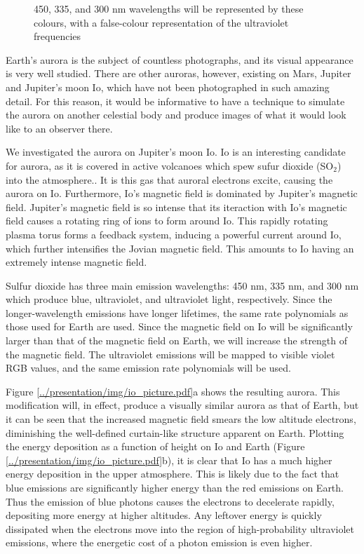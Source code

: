 \documentclass[twocolumn]{article}
\renewcommand{\insertfigure}[3]{\begin{figure}[tbh]
\centering
	\makebox[\columnwidth][c]{
	\texttt{[image: \#1]}
	}
\caption{#3}
\label{#1}
\end{figure}}
\newcommand{\insertfigurewide}[3]{\begin{figure*}[bth]
\centering
	\makebox[\columnwidth][c]{
	\texttt{[image: \#1]}
	}
\caption{#3}
\label{#1}
\end{figure*}}
\begin{document}

\insertfigure{../presentation/img/io_spect.pdf}{0.8}{450, 335, and 300 nm wavelengths will be represented by these colours, with a false-colour representation of the ultraviolet frequencies}


Earth's aurora is the subject of countless photographs, and its visual appearance is very well studied. There are other auroras, however, existing on Mars, Jupiter and Jupiter's moon Io, which have not been photographed in such amazing detail.  For this reason, it would be informative to have a technique to simulate the aurora on another celestial body and produce images of what it would look like to an observer there.


We investigated the aurora on Jupiter's moon Io.  Io is an interesting candidate for aurora, as it is covered in active volcanoes which spew sufur dioxide (SO$_2$) into the atmosphere.\cite{Ballester1994,Keszthelyi2001}.  It is this gas that auroral electrons excite, causing the aurora on Io.  Furthermore, Io's magnetic field is dominated by Jupiter's magnetic field.  Jupiter's magnetic field is so intense that its iteraction with Io's magnetic field causes a rotating ring of ions to form around Io.  This rapidly rotating plasma torus forms a feedback system, inducing a powerful current around Io, which further intensifies the Jovian magnetic field\cite{Soediono1989a}.  This amounts to Io having an extremely intense magnetic field.

Sulfur dioxide has three main emission wavelengths: 450 nm, 335 nm, and 300 nm which produce blue, ultraviolet, and ultraviolet light, respectively\cite{Ajello2002}. Since the longer-wavelength emissions have longer lifetimes\cite{Caton1968}, the same rate polynomials as those used for Earth are used.  Since the magnetic field on Io will be significantly larger than that of the magnetic field on Earth, we will increase the strength of the magnetic field.  The ultraviolet emissions will be mapped to visible violet RGB values, and the same emission rate polynomials will be used.

Figure \ref{../presentation/img/io_picture.pdf}a shows the resulting aurora.  This modification will, in effect, produce a visually similar aurora as that of Earth, but it can be seen that the increased magnetic field smears the low altitude electrons, diminishing the well-defined curtain-like structure apparent on Earth. Plotting the energy deposition as a function of height on Io and Earth (Figure \ref{../presentation/img/io_picture.pdf}b), it is clear that Io has a much higher energy deposition in the upper atmosphere. This is likely due to the fact that blue emissions are significantly higher energy than the red emissions on Earth.  Thus the emission of blue photons causes the electrons to decelerate rapidly, depositing more energy at higher altitudes.  Any leftover energy is quickly dissipated when the electrons move into the region of high-probability ultraviolet emissions, where the energetic cost of a photon emission is even higher.
\end{document}

